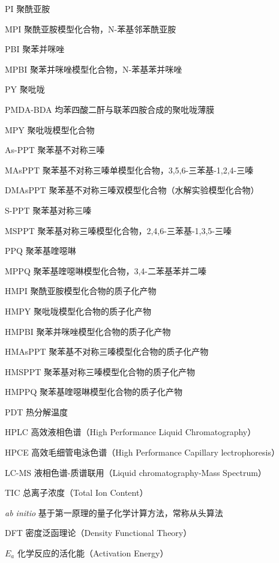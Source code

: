 
\begin{denotation}[3cm]
  \item[PI] 聚酰亚胺
  \item[MPI] 聚酰亚胺模型化合物，N-苯基邻苯酰亚胺
  \item[PBI] 聚苯并咪唑
  \item[MPBI] 聚苯并咪唑模型化合物，N-苯基苯并咪唑
  \item[PY] 聚吡咙
  \item[PMDA-BDA] 均苯四酸二酐与联苯四胺合成的聚吡咙薄膜
  \item[MPY] 聚吡咙模型化合物
  \item[As-PPT] 聚苯基不对称三嗪
  \item[MAsPPT] 聚苯基不对称三嗪单模型化合物，3,5,6-三苯基-1,2,4-三嗪
  \item[DMAsPPT] 聚苯基不对称三嗪双模型化合物（水解实验模型化合物）
  \item[S-PPT] 聚苯基对称三嗪
  \item[MSPPT] 聚苯基对称三嗪模型化合物，2,4,6-三苯基-1,3,5-三嗪
  \item[PPQ] 聚苯基喹噁啉
  \item[MPPQ] 聚苯基喹噁啉模型化合物，3,4-二苯基苯并二嗪
  \item[HMPI] 聚酰亚胺模型化合物的质子化产物
  \item[HMPY] 聚吡咙模型化合物的质子化产物
  \item[HMPBI] 聚苯并咪唑模型化合物的质子化产物
  \item[HMAsPPT] 聚苯基不对称三嗪模型化合物的质子化产物
  \item[HMSPPT] 聚苯基对称三嗪模型化合物的质子化产物
  \item[HMPPQ] 聚苯基喹噁啉模型化合物的质子化产物
  \item[PDT] 热分解温度
  \item[HPLC] 高效液相色谱（High Performance Liquid Chromatography）
  \item[HPCE] 高效毛细管电泳色谱（High Performance Capillary lectrophoresis）
  \item[LC-MS] 液相色谱-质谱联用（Liquid chromatography-Mass Spectrum）
  \item[TIC] 总离子浓度（Total Ion Content）
  \item[\textit{ab initio}] 基于第一原理的量子化学计算方法，常称从头算法
  \item[DFT] 密度泛函理论（Density Functional Theory）
  \item[$E_a$] 化学反应的活化能（Activation Energy）

\end{denotation}
